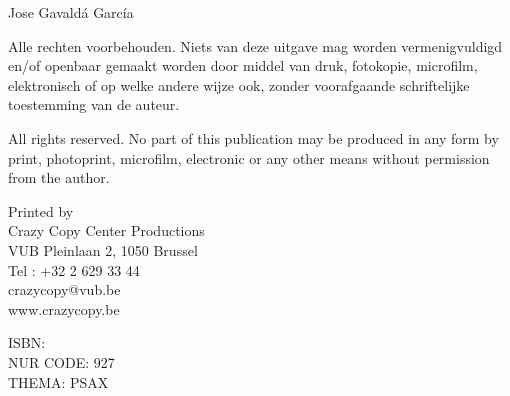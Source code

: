 \vspace*{\fill}

\noindent \textcopyright Jose Gavaldá García

\vspace{1em}
\noindent Alle rechten voorbehouden. Niets van deze uitgave mag worden vermenigvuldigd en/of openbaar gemaakt worden door middel van druk, fotokopie, microfilm, elektronisch of op welke andere wijze ook, zonder voorafgaande schriftelijke toestemming van de auteur.

\vspace{1em}
\noindent All rights reserved. No part of this publication may be produced in any form by print, photoprint, microfilm, electronic or any other means without permission from the author.

\vspace{1em}
\noindent Printed by\\
Crazy Copy Center Productions\\
VUB  Pleinlaan 2, 1050 Brussel\\
Tel : +32 2 629 33 44\\
crazycopy@vub.be\\
www.crazycopy.be

\vspace{1em}
\noindent ISBN: \\
NUR CODE: 927	\\
THEMA: PSAX
